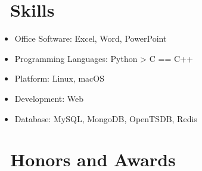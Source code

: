 \documentclass{resume}
\begin{document}

\section{\faCogs\ Skills}
\begin{itemize}[parsep=0.5ex]
  \item Office Software: Excel, Word, PowerPoint
  \item Programming Languages: Python > C == C++
  \item Platform: Linux, macOS
  \item Development: Web
  \item Database: MySQL, MongoDB, OpenTSDB, Redis
\end{itemize}

\section{\faHeartO\ Honors and Awards}


%
%
\end{document}
